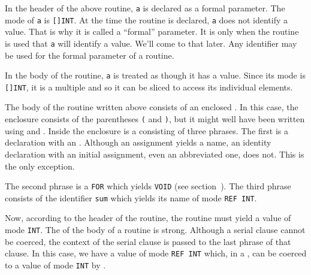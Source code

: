 In the header of the above routine, \verb|a| is declared as a formal
parameter.  The mode of \verb|a| is \verb|[]INT|.  At the time the
routine is declared, \verb|a| does not identify a value.  That is why
it is called a ``formal'' parameter.  It is only when the routine is
used that \verb|a| will identify a value.  We'll come to that later.
Any identifier may be used for the formal parameter of a routine.

In the body of the routine, \verb|a| is treated as though it has a
value. Since its mode is \verb|[]INT|, it is a multiple and so it
can be sliced to access its individual elements.

The body of the routine written above consists of an enclosed
. In this case, the enclosure consists
of the parentheses \verb|(| and \verb|)|, but it might well have been
written using  and . Inside the enclosure is a
 consisting of three phrases. The
first is a declaration with an .  Although an
assignment yields a name, an identity declaration with an initial
assignment, even an abbreviated one, does not.  This is the only
exception.

The second phrase is a \verb|FOR| 
which yields \verb|VOID| (see section~).  The third
phrase consists of the identifier \verb|sum| which yields its name
of mode \verb|REF INT|.

Now, according to the header of the routine, the routine must yield a
value of mode \verb|INT|.  The  of the
body of a routine is strong.  Although a serial
clause cannot be coerced, the context of the serial clause is passed
to the last phrase of that clause.  In this case, we have a value of
mode \verb|REF INT| which, in a ,
can be coerced to a value of mode \verb|INT| by
.

